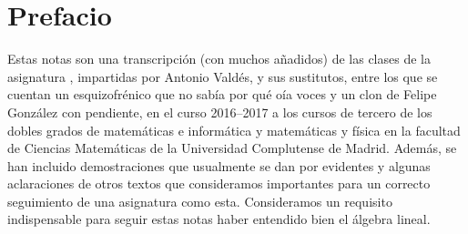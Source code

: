 \chapter*{Prefacio}
Estas notas son una transcripción (con muchos añadidos) de las clases de la asignatura , impartidas por Antonio Valdés, y sus sustitutos, entre los que se cuentan un esquizofrénico que no sabía por qué oía voces y un clon de Felipe González con pendiente, en el curso 2016--2017 a los cursos de tercero de los dobles grados de matemáticas e informática y matemáticas y física en la facultad de Ciencias Matemáticas de la Universidad Complutense de Madrid. Además, se han incluido demostraciones que usualmente se dan por evidentes y algunas aclaraciones de otros textos que consideramos importantes para un correcto seguimiento de una asignatura como esta. Consideramos un requisito indispensable para seguir estas notas haber entendido bien el álgebra lineal.